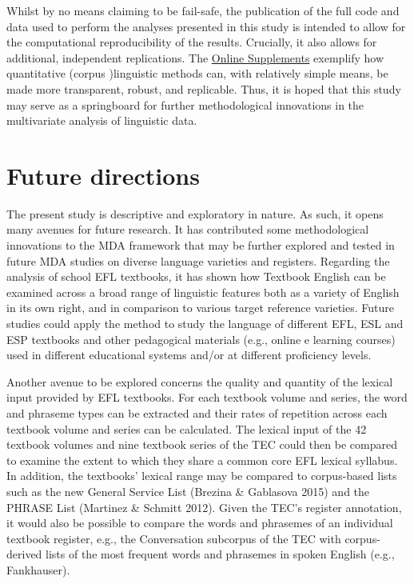 \documentclass[
  letterpaper,
  DIV=11,
  numbers=noendperiod]{scrreprt}
\begin{document}
Whilst by no means claiming to be fail-safe, the publication of the full
code and data used to perform the analyses presented in this study is
intended to allow for the computational reproducibility of the results.
Crucially, it also allows for additional, independent replications. The
\href{https://elenlefoll.github.io/TextbookMDA}{Online Supplements}
exemplify how quantitative (corpus )linguistic methods can, with
relatively simple means, be made more transparent, robust, and
replicable. Thus, it is hoped that this study may serve as a springboard
for further methodological innovations in the multivariate analysis of
linguistic data.

\section{Future directions}\label{future-directions}

The present study is descriptive and exploratory in nature. As such, it
opens many avenues for future research. It has contributed some
methodological innovations to the MDA framework that may be further
explored and tested in future MDA studies on diverse language varieties
and registers. Regarding the analysis of school EFL textbooks, it has
shown how Textbook English can be examined across a broad range of
linguistic features both as a variety of English in its own right, and
in comparison to various target reference varieties. Future studies
could apply the method to study the language of different EFL, ESL and
ESP textbooks and other pedagogical materials (e.g., online e learning
courses) used in different educational systems and/or at different
proficiency levels.

Another avenue to be explored concerns the quality and quantity of the
lexical input provided by EFL textbooks. For each textbook volume and
series, the word and phraseme types can be extracted and their rates of
repetition across each textbook volume and series can be calculated. The
lexical input of the 42 textbook volumes and nine textbook series of the
TEC could then be compared to examine the extent to which they share a
common core EFL lexical syllabus. In addition, the textbooks' lexical
range may be compared to corpus-based lists such as the new General
Service List (Brezina \& Gablasova 2015) and the PHRASE List (Martinez
\& Schmitt 2012). Given the TEC's register annotation, it would also be
possible to compare the words and phrasemes of an individual textbook
register, e.g., the Conversation subcorpus of the TEC with
corpus-derived lists of the most frequent words and phrasemes in spoken
English (e.g., Fankhauser).
\end{document}
